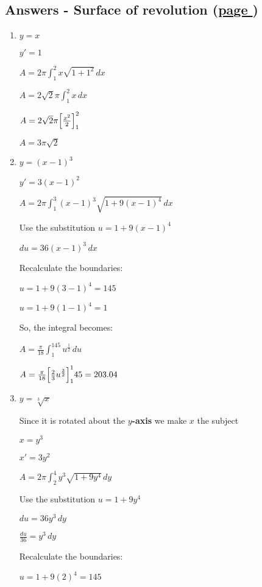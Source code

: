 \documentclass[../main.tex]{subfiles}
\begin{document}
\hypertarget{surfaceofrevolutionanswers}{\subsection*{Answers - Surface of revolution (\hyperlink{surfaceofrevolutionlink}{page \pageref{Surface of revolution}})}}

\label{Surface of revolution answers}
\begin{enumerate}[itemsep=0.7cm]
    \item 
    $y=x$
    
    $y'=1$
    
    $A=2\pi \int_1^2 x\sqrt{1+1^2}\,dx$

    $A=2\sqrt{2}\pi \int_1^2 x\,dx$

    $A=2\sqrt{2}\pi \Bigl[\frac{x^2}{2}\Bigr]_1^2$

    $A=3\pi\sqrt{2}$

    \item 
    $y=(x-1)^3$
    
    $y'=3(x-1)^2$

    $A=2\pi \int_1^3 (x-1)^3 \sqrt{1+9(x-1)^4}\,dx$

    Use the substitution $u=1+9(x-1)^4$

    $du=36(x-1)^3\,dx$

    Recalculate the boundaries:

    $u=1+9(3-1)^4=145$

    $u=1+9(1-1)^4=1$

    So, the integral becomes:

    $A=\frac{\pi}{18}\int_1^{145} u^{\frac{1}{2}}\,du$

    $A=\frac{\pi}{18}\Bigl[\frac{2}{3}u^{\frac{3}{2}}\Bigr]_1^145=203.04$


    \item 
    $y=\sqrt[3]{x}$
    
    Since it is rotated about the \textbf{$y$-axis} we make $x$ the subject
    
    $x=y^3$

    $x'=3y^2$

    $A=2\pi \int_2^4 y^3\sqrt{1+9y^4}\,dy$

    Use the substitution $u=1+9y^4$

    $du=36y^3\,dy$

    $\frac{du}{36}=y^3\,dy$

    Recalculate the boundaries:

    $u=1+9(2)^4=145$


\end{enumerate}
\end{document}
